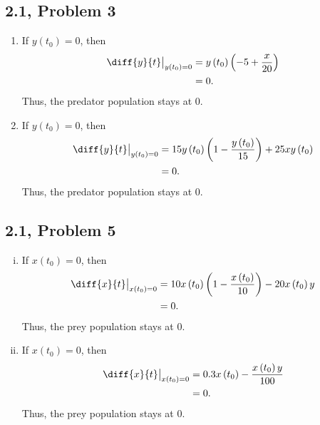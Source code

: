 \documentclass[10pt]{mypackage}
\begin{document}
\subsection{2.1, Problem 3}%
\begin{enumerate}
  \item If $y\left(t_0\right) = 0$, then
    \begin{align*}
      \diff{y}{t}\bigr\vert_{y\left(t_0\right) = 0} &= y\left(t_0\right)\left(-5 + \frac{x}{20}\right)\\
                                                    &= 0.
    \end{align*}
    Thus, the predator population stays at $0$.
  \item If $y\left(t_0\right) = 0$, then
    \begin{align*}
      \diff{y}{t}\bigr\vert_{y\left(t_0\right) = 0} &= 15y\left(t_0\right)\left(1-\frac{y\left(t_0\right)}{15}\right) + 25xy\left(t_0\right)\\
                                                    &= 0.
    \end{align*}
    Thus, the predator population stays at $0$.
\end{enumerate}
\subsection{2.1, Problem 5}%
\begin{enumerate}[(i)]
  \item If $x\left(t_0\right) = 0$, then 
    \begin{align*}
      \diff{x}{t}\bigr\vert_{x\left(t_0\right) = 0} &= 10x\left(t_0\right)\left(1-\frac{x\left(t_0\right)}{10}\right) - 20x\left(t_0\right)y\\
                  &= 0.
    \end{align*}
    Thus, the prey population stays at $0$.
  \item If $x\left(t_0\right) = 0$, then
    \begin{align*}
      \diff{x}{t}\bigr\vert_{x\left(t_0\right) = 0} &= 0.3x\left(t_0\right) - \frac{x\left(t_0\right)y}{100}\\
                                                    &= 0.
    \end{align*}
    Thus, the prey population stays at $0$.
\end{enumerate}
\end{document}
